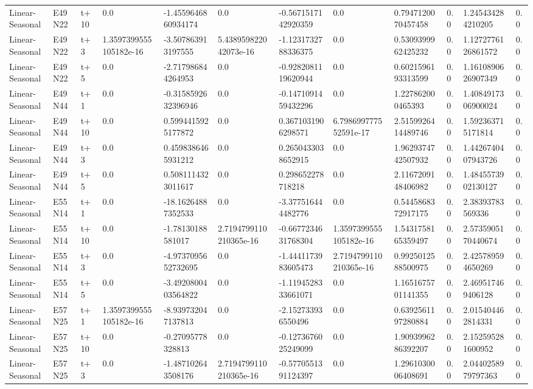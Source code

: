 \begin{landscape}
\begin{longtable}{llllllllllll}
Linear-Seasonal & E49N22 & t+10 & 0.0 & -1.4559646860934174 & 0.0 & -0.5671517142920359 & 0.0 & 0.7947120070457458 & 0.0 & 1.245434284210205 & 0.0 \\
Linear-Seasonal & E49N22 & t+3 & 1.3597399555105182e-16 & -3.507863913197555 & 5.438959822042073e-16 & -1.1231732788336375 & 0.0 & 0.5309399962425232 & 0.0 & 1.1272776126861572 & 0.0 \\
Linear-Seasonal & E49N22 & t+5 & 0.0 & -2.717986844264953 & 0.0 & -0.9282081119620944 & 0.0 & 0.6021596193313599 & 0.0 & 1.1610890626907349 & 0.0 \\
Linear-Seasonal & E49N44 & t+1 & 0.0 & -0.3158592632396946 & 0.0 & -0.1471091459432296 & 0.0 & 1.227862000465393 & 0.0 & 1.4084917306900024 & 0.0 \\
Linear-Seasonal & E49N44 & t+10 & 0.0 & 0.5994415925177872 & 0.0 & 0.3671031906298571 & 6.798699777552591e-17 & 2.5159926414489746 & 0.0 & 1.592363715171814 & 0.0 \\
Linear-Seasonal & E49N44 & t+3 & 0.0 & 0.4598386465931212 & 0.0 & 0.2650433038652915 & 0.0 & 1.9629374742507932 & 0.0 & 1.4426740407943726 & 0.0 \\
Linear-Seasonal & E49N44 & t+5 & 0.0 & 0.5081114323011617 & 0.0 & 0.298652278718218 & 0.0 & 2.1167209148406982 & 0.0 & 1.4845573902130127 & 0.0 \\
Linear-Seasonal & E55N14 & t+1 & 0.0 & -18.16264887352533 & 0.0 & -3.377516444482776 & 0.0 & 0.5445868372917175 & 0.0 & 2.38393783569336 & 0.0 \\
Linear-Seasonal & E55N14 & t+10 & 0.0 & -1.78130188581017 & 2.7194799110210365e-16 & -0.6677234631768304 & 1.3597399555105182e-16 & 1.5431758165359497 & 0.0 & 2.5735905170440674 & 0.0 \\
Linear-Seasonal & E55N14 & t+3 & 0.0 & -4.9737095652732695 & 0.0 & -1.4441173983605473 & 2.7194799110210365e-16 & 0.9925012588500975 & 0.0 & 2.425789594650269 & 0.0 \\
Linear-Seasonal & E55N14 & t+5 & 0.0 & -3.4920800403564822 & 0.0 & -1.1194528333661071 & 0.0 & 1.1651675701141355 & 0.0 & 2.469517469406128 & 0.0 \\
Linear-Seasonal & E57N25 & t+1 & 1.3597399555105182e-16 & -8.939732047137813 & 0.0 & -2.152733936550496 & 0.0 & 0.6392561197280884 & 0.0 & 2.015404462814331 & 0.0 \\
Linear-Seasonal & E57N25 & t+10 & 0.0 & -0.27095778328813 & 0.0 & -0.1273676025249099 & 0.0 & 1.9093996286392207 & 0.0 & 2.152595281600952 & 0.0 \\
Linear-Seasonal & E57N25 & t+3 & 0.0 & -1.487102643508176 & 2.7194799110210365e-16 & -0.5770551391124397 & 0.0 & 1.2961030006408691 & 0.0 & 2.0440258979797363 & 0.0 \\

\end{longtable}
\end{landscape}
